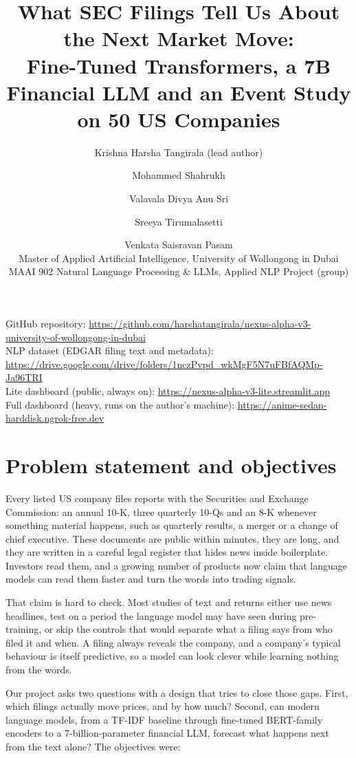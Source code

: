 \documentclass[11pt,a4paper]{article}
\title{What SEC Filings Tell Us About the Next Market Move:\\ Fine-Tuned Transformers, a 7B Financial LLM and an Event Study on 50 US Companies}
\author{Krishna Harsha Tangirala (lead author) \and Mohammed Shahrukh \and Valavala Divya Anu Sri \and Sreeya Tirumalasetti \and Venkata Saisravan Pasam\\[2pt]
\small Master of Applied Artificial Intelligence, University of Wollongong in Dubai\\
\small MAAI 902 Natural Language Processing \& LLMs, Applied NLP Project (group)}
\date{}
\begin{document}
\maketitle

\begin{center}
\small
GitHub repository: \url{https://github.com/harshatangirala/nexus-alpha-v3-university-of-wollongong-in-dubai}\\
NLP dataset (EDGAR filing text and metadata): \url{https://drive.google.com/drive/folders/1nczPvpd_wkMgF5N7uFBfAQMp-Ja96TRI}\\
Lite dashboard (public, always on): \url{https://nexus-alpha-v3-lite.streamlit.app}\\
Full dashboard (heavy, runs on the author's machine): \url{https://anime-sedan-harddisk.ngrok-free.dev}
\end{center}

\section{Problem statement and objectives}

Every listed US company files reports with the Securities and Exchange Commission: an annual 10-K, three quarterly 10-Qs and an 8-K whenever something material happens, such as quarterly results, a merger or a change of chief executive. These documents are public within minutes, they are long, and they are written in a careful legal register that hides news inside boilerplate. Investors read them, and a growing number of products now claim that language models can read them faster and turn the words into trading signals.

That claim is hard to check. Most studies of text and returns either use news headlines, test on a period the language model may have seen during pre-training, or skip the controls that would separate what a filing says from who filed it and when. A filing always reveals the company, and a company's typical behaviour is itself predictive, so a model can look clever while learning nothing from the words.

Our project asks two questions with a design that tries to close those gaps. First, which filings actually move prices, and by how much? Second, can modern language models, from a TF-IDF baseline through fine-tuned BERT-family encoders to a 7-billion-parameter financial LLM, forecast what happens next from the text alone? The objectives were:
\end{document}
